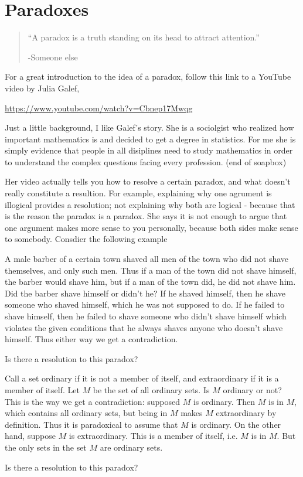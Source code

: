 \section{Paradoxes}
\begin{quotation}
``A paradox is a truth standing on its head to attract attention.''

\hfill -Someone else
\end{quotation}

For a great introduction to the idea of a paradox, follow this link to a YouTube video by  Julia Galef,

\url{https://www.youtube.com/watch?v=Cbnep17Mwqg}

Just a little background, I like Galef's story.  She is a sociolgist who realized how important mathematics is and decided to get a degree in statistics.  For me she is simply evidence that people in all disiplines need to study mathematics in order to understand the complex questions facing every profession.  (end of soapbox)


Her video actually tells you how to resolve a certain paradox, and what doesn't really constitute a resultion.  For example, explaining why one agrument is illogical provides a resolution; not explaining why both are logical - because that is the reason the paradox is a paradox.  She says it is not enough to argue that one argument makes more sense to you personally, because both sides make sense to somebody.  Consdier the following example


\begin{example}
A male barber of a certain town shaved all men of the town who did not shave themselves, and only such men. Thus if a man of the town did not shave himself, the barber would shave him, but if a man of the town did, he did not shave him. Did the barber shave himself or didn't he? If he shaved himself, then he shave someone who shaved himself, which he was not supposed to do. If he failed to shave himself, then he failed to shave someone who didn't shave himself which violates the given conditions that he always shaves anyone who doesn't shave himself.  Thus either way we get a contradiction.  

Is there a  resolution to this paradox?
\end{example}

\begin{example}
Call a set ordinary if it is not a member of itself, and extraordinary if it is a member of itself. Let $M$ be the set of all ordinary sets. Is $M$ ordinary or not? This is the way we get a contradiction: supposed $M$ is ordinary. Then $M$ is in $M$, which  contains all ordinary sets, but being in $M$ makes $M$ extraordinary by definition. Thus it is paradoxical to assume that $M$ is ordinary. On the other hand, suppose $M$ is extraordinary. This is a member of itself, i.e. $M$ is in $M$. But the only sets in the set $M$ are ordinary sets.  

Is there a  resolution to this paradox?
\end{example}


